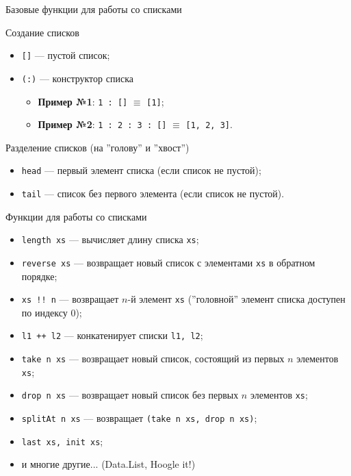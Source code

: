 \documentclass{beamer}
\begin{document}
  \begin{frame}{Базовые функции для работы со списками}
      \begin{block}{Создание списков}
        \begin{itemize}
            \item \texttt{[]} --- пустой список;
            \item \texttt{(:)} --- конструктор списка
            \begin{itemize}
                \item \textbf{Пример №1}: \texttt{1 : []} $\equiv$ \texttt{[1]};
                \item \textbf{Пример №2}: \texttt{1 : 2 : 3 : []} $\equiv$ \texttt{[1, 2, 3]}.
            \end{itemize}
        \end{itemize}
      \end{block}
      \begin{block}{Разделение списков (на ''голову'' и ''хвост'')}
        \begin{itemize}
            \item \texttt{head} --- первый элемент списка (если список не пустой);
            \item \texttt{tail} --- список без первого элемента (если список не пустой).
        \end{itemize}
      \end{block}
  \end{frame}
  \begin{frame}{Функции для работы со списками}
      \begin{itemize}
          \item \texttt{length xs} --- вычисляет длину списка \texttt{xs};
          \item \texttt{reverse xs} --- возвращает новый список с элементами \texttt{xs} в обратном порядке;
          \item \texttt{xs !! n} --- возвращает $n$-й элемент \texttt{xs} (''головной'' элемент списка доступен по индексу 0);
          \item \texttt{l1 ++ l2} --- конкатенирует списки \texttt{l1, l2};
          \item \texttt{take n xs} --- возвращает новый список, состоящий из первых $n$ элементов \texttt{xs};
          \item \texttt{drop n xs} --- возвращает новый список без первых $n$ элементов \texttt{xs};
          \item \texttt{splitAt n xs} --- возвращает \texttt{(take n xs,~drop n xs)};
          \item \texttt{last xs,~init xs};
          \item и многие другие... (Data.List, Hoogle it!)
      \end{itemize}
  \end{frame}
\end{document}
